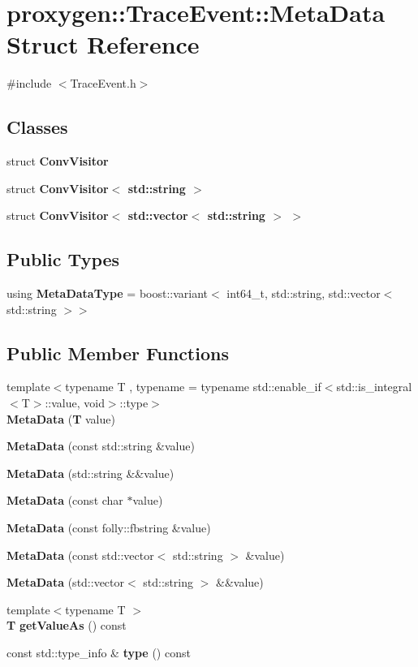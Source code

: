 \section{proxygen\+:\+:Trace\+Event\+:\+:Meta\+Data Struct Reference}
\label{structproxygen_1_1TraceEvent_1_1MetaData}


{\ttfamily \#include $<$Trace\+Event.\+h$>$}

\subsection*{Classes}
\begin{DoxyCompactItemize}
\item 
struct {\bf Conv\+Visitor}
\item 
struct {\bf Conv\+Visitor$<$ std\+::string $>$}
\item 
struct {\bf Conv\+Visitor$<$ std\+::vector$<$ std\+::string $>$ $>$}
\end{DoxyCompactItemize}
\subsection*{Public Types}
\begin{DoxyCompactItemize}
\item 
using {\bf Meta\+Data\+Type} = boost\+::variant$<$ int64\+\_\+t, std\+::string, std\+::vector$<$ std\+::string $>$$>$
\end{DoxyCompactItemize}
\subsection*{Public Member Functions}
\begin{DoxyCompactItemize}
\item 
{\footnotesize template$<$typename T , typename  = typename std\+::enable\+\_\+if$<$std\+::is\+\_\+integral$<$\+T$>$\+::value,                                                 void$>$\+::type$>$ }\\{\bf Meta\+Data} ({\bf T} value)
\item 
{\bf Meta\+Data} (const std\+::string \&value)
\item 
{\bf Meta\+Data} (std\+::string \&\&value)
\item 
{\bf Meta\+Data} (const char $\ast$value)
\item 
{\bf Meta\+Data} (const folly\+::fbstring \&value)
\item 
{\bf Meta\+Data} (const std\+::vector$<$ std\+::string $>$ \&value)
\item 
{\bf Meta\+Data} (std\+::vector$<$ std\+::string $>$ \&\&value)
\item 
{\footnotesize template$<$typename T $>$ }\\{\bf T} {\bf get\+Value\+As} () const 
\item 
const std\+::type\+\_\+info \& {\bf type} () const 
\end{DoxyCompactItemize}
